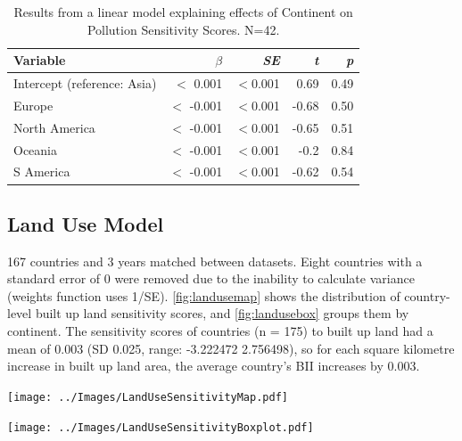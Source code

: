 \documentclass[11pt, a4paper, titlepage]{article}
\begin{document}
		\begin{table}[h!]
		\begin{center}
			\caption{Results from a linear model explaining effects of Continent on Pollution Sensitivity Scores. \textmd{ N=42.}}
			\label{tab:pollution}
			\begin{tabular}{l|r|r|r|r} %
				Variable & $\beta$ & \textit{SE} & \textit{t} & \textit{p}\\
				\hline
				Intercept (reference: Asia) & $<$ 0.001 & $<$0.001 & 0.69 & 0.49\\
				Europe & $<$ -0.001 & $<$0.001 & -0.68 & 0.50 \\
				North America & $<$ -0.001 & $<$0.001 & -0.65 & 0.51\\
				Oceania & $<$ -0.001 & $<$0.001 & -0.2 & 0.84\\
				S America & $<$ -0.001 & $<$0.001 & -0.62 & 0.54\\
			\end{tabular}
		\end{center}
	\end{table}

\newpage
	\subsection*{Land Use Model}
	
	167 countries and 3 years matched between datasets. Eight countries with a standard error of 0 were removed due to the inability to calculate variance (weights function uses 1/SE).  \autoref{fig:landusemap} shows the distribution of country-level built up land sensitivity scores, and \autoref{fig:landusebox} groups them by continent. The sensitivity scores of countries (n = 175) to built up land had a mean of 0.003 (SD 0.025, range: -3.222472  2.756498), so for each square kilometre increase in built up land area, the average country's BII increases by 0.003.
	
	\begin{center}
		\texttt{[image: ../Images/LandUseSensitivityMap.pdf]}
		\label{fig:landusemap}
		
		\texttt{[image: ../Images/LandUseSensitivityBoxplot.pdf]}
	    \label{fig:landusebox}
    \end{center}
\end{document}
